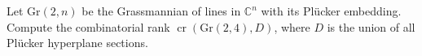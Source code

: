 Let $\mathrm{Gr}(2,n)$ be the Grassmannian of lines in $\mathbb{C}^n$ with its Pl\"ucker embedding. Compute the combinatorial rank $\operatorname{cr}(\mathrm{Gr}(2,4),D)$, where $D$ is the union of all Pl\"ucker hyperplane sections.
